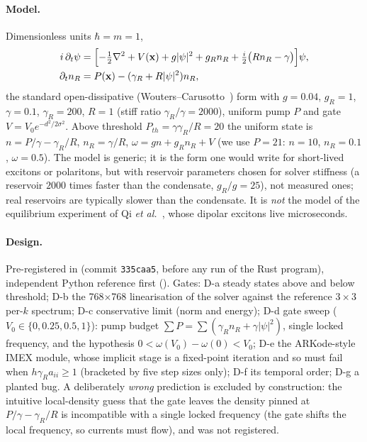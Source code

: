 \documentclass[11pt,a4paper]{article}
\begin{document}
\paragraph{Model.} Dimensionless units $\hbar=m=1$,
\begin{align}
i\,\partial_t\psi &= \Bigl[-\tfrac12\nabla^2+V(\mathbf x)+g|\psi|^2+g_Rn_R+\tfrac i2\bigl(Rn_R-\gamma\bigr)\Bigr]\psi,\\
\partial_tn_R&=P(\mathbf x)-(\gamma_R+R|\psi|^2)n_R,
\end{align}
the standard open-dissipative (Wouters--Carusotto~\cite{WoutersCarusotto2007}) form with $g=0.04$, $g_R=1$, $\gamma=0.1$, $\gamma_R=200$, $R=1$ (stiff ratio
$\gamma_R/\gamma=2000$), uniform pump $P$ and gate $V=V_0e^{-d^2/2\sigma^2}$. Above threshold $P_{th}=\gamma\gamma_R/R=20$ the
uniform state is $n=P/\gamma-\gamma_R/R$, $n_R=\gamma/R$, $\omega=gn+g_Rn_R+V$ (we use $P=21$: $n=10$, $n_R=0.1$, $\omega=0.5$).
The model is generic; it is the form one would write for short-lived excitons or polaritons, but with reservoir parameters chosen for solver stiffness (a reservoir $2000$ times faster than the condensate, $g_R/g=25$), not measured ones; real reservoirs are typically slower than the condensate. It is \emph{not} the model of the
equilibrium experiment of Qi \emph{et al.}~\cite{Qi2026}, whose dipolar excitons live microseconds.

\paragraph{Design.} Pre-registered in  (commit \texttt{335caa5}, before any run of the
Rust program), independent Python reference first (). Gates: D-a steady states above and below threshold;
D-b the 768$\times$768 linearisation of the solver against the reference $3\times3$ per-$k$ spectrum; D-c conservative limit
(norm and energy); D-d gate sweep ($V_0\in\{0,0.25,0.5,1\}$): pump budget $\sum P=\sum(\gamma_Rn_R+\gamma|\psi|^2)$, single locked
frequency, and the hypothesis $0<\omega(V_0)-\omega(0)<V_0$; D-e the ARKode-style IMEX module, whose implicit stage is a fixed-point
iteration and so must fail when $h\gamma_Ra_{ii}\geq1$ (bracketed by five step sizes only); D-f its temporal order; D-g a planted bug. A deliberately
\emph{wrong} prediction is excluded by construction: the intuitive local-density guess that the gate leaves the density pinned at
$P/\gamma-\gamma_R/R$ is incompatible with a single locked frequency (the gate shifts the local frequency, so currents must flow),
and was not registered.
\end{document}
